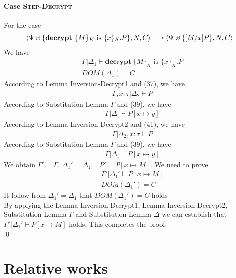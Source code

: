 \documentclass[master,english]{kuisthesis}
\theoremstyle{definition}
\begin{document}
\paragraph{Case \textsc{Step-Decrypt}} For the case
\begin{align*}
\langle\Psi \uplus\{ \text{\textbf{decrypt}}\ \{M\}_K
\text{ is } \{x\}_K . P\} , N, C\rangle &\longrightarrow\langle\Psi \uplus\{[M / x] P\} , N, C \rangle \\
\end{align*}\noindent
We have
\begin{align}
    &\Gamma | \Delta_1 \vdash \textbf{decrypt}\ \{M\}_K
\text{ is } \{x\}_K . P
    \\&DOM(\Delta_1) = C 
\end{align}\noindent
According to Lemma Inversion-Decrypt1 and (37), we have
\begin{align}
    &\Gamma, x:\tau | \Delta_2  \vdash  P  
\end{align}\noindent
According to Substitution Lemma-$\Gamma$ and (39), we have
\begin{align}
    &\Gamma | \Delta_1 \vdash P[x \mapsto y]  
\end{align}\noindent
According to Lemma Inversion-Decrypt2 and (41), we have
\begin{align}
    &\Gamma| \Delta_2, x:\tau   \vdash  P  
\end{align}\noindent
According to Substitution Lemma-$\Gamma$ and (39), we have
\begin{align}
    &\Gamma | \Delta_1 \vdash P[x \mapsto y]  
\end{align}\noindent
We obtain $\Gamma' = \Gamma$. $\Delta_1' = \Delta_1 $, . $P' = P[x \mapsto M] $. We need to prove
\begin{align*}
    &\Gamma' | \Delta_1' \vdash P [x \mapsto M]
    \\&DOM(\Delta_1') = C 
\end{align*}\noindent
It follow from $\Delta_1' = \Delta_1 $ that  $DOM(\Delta_1') = C $ holds
\\By applying the Lemma Inversion-Decrypt1, Lemma Inversion-Decrypt2, Substitution Lemma-$\Gamma$ and Substitution Lemma-$\Delta$  we can establish that  $ \Gamma' | \Delta_1' \vdash P [x \mapsto M]$ holds. This completes the proof.\\
\qed



\section{Relative works}\label{sec-structure}
\end{document}
